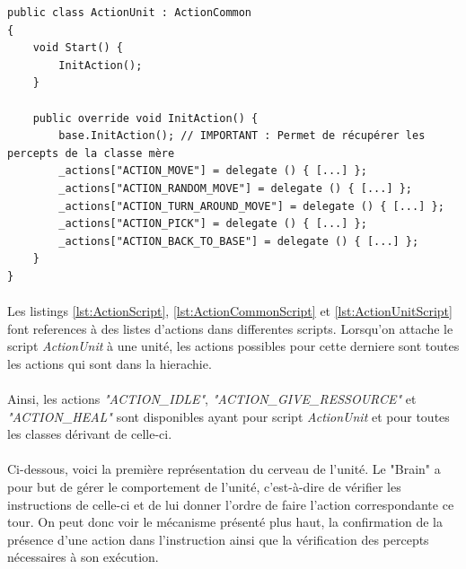 \documentclass{report}
\begin{document}
\begin{lstlisting}[language={[Sharp]C},label={lst:ActionUnitScript}, caption=  Code du script ActionUnit.cs dérivant de la classe ActionCommon.cs]
public class ActionUnit : ActionCommon
{
    void Start() {
        InitAction();
    }

    public override void InitAction() {
        base.InitAction(); // IMPORTANT : Permet de récupérer les percepts de la classe mère
        _actions["ACTION_MOVE"] = delegate () { [...] };
        _actions["ACTION_RANDOM_MOVE"] = delegate () { [...] };
        _actions["ACTION_TURN_AROUND_MOVE"] = delegate () { [...] };
        _actions["ACTION_PICK"] = delegate () { [...] };
        _actions["ACTION_BACK_TO_BASE"] = delegate () { [...] };
    }
}
\end{lstlisting}

\paragraph{}
Les listings \ref{lst:ActionScript}, \ref{lst:ActionCommonScript} et \ref{lst:ActionUnitScript} font references à des listes d'actions dans differentes scripts. Lorsqu'on attache le script \textit{ActionUnit} à une unité, les actions possibles pour cette derniere sont toutes les actions qui sont dans la hierachie.
\paragraph{}
Ainsi, les actions \textit{"ACTION\_IDLE"}, \textit{"ACTION\_GIVE\_RESSOURCE"} et \textit{"ACTION\_HEAL"} sont disponibles ayant pour script \textit{ActionUnit} et pour toutes les classes dérivant de celle-ci.

\paragraph{}
Ci-dessous, voici la première représentation du cerveau de l'unité. Le "Brain" a pour but de gérer le comportement de l'unité, c'est-à-dire de vérifier les instructions de celle-ci et de lui donner l'ordre de faire l'action correspondante ce tour. On peut donc voir le mécanisme présenté plus haut, la confirmation de la présence d'une action dans l'instruction ainsi que la vérification des percepts nécessaires à son exécution.
\end{document}

